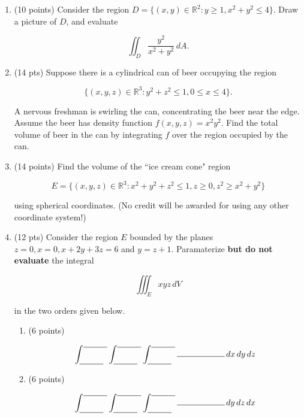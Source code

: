\documentclass[12 pt]{report}
\begin{document}
\newpage

\begin{enumerate}

\item (10 points) Consider the region $D = \{(x,y) \in \mathbb{R}^2: y \geq 1, x^2+y^2 \leq 4\}.$ Draw a picture of $D$, and evaluate

\[
\iint_D \frac{y^2}{x^2+y^2} \, dA.
\]

\newpage

\item (14 pts) Suppose there is a cylindrical can of beer occupying the region 

\[
\{(x,y,z) \in \mathbb{R}^3: y^2 + z^2 \leq 1, 0 \leq x \leq 4\}.
\]

A nervous freshman is swirling the can, concentrating the beer near the edge. Assume the beer has density function $f(x,y,z) = x^2 y^2$. Find the total volume of beer in the can by integrating $f$ over the region occupied by the can. 

\newpage

\item (14 points) Find the volume of the ``ice cream cone" region 

\[
E = \{(x,y,z) \in \mathbb{R}^3: x^2+y^2+z^2 \leq 1, z \geq 0, z^2 \geq x^2+y^2\}
\] 

using spherical coordinates. (No credit will be awarded for using any other coordinate system!)

\newpage


\item (12 pts) Consider the region $E$ bounded by the planes $z = 0, x = 0, x+2y+3z = 6$ and $y = z+1$. Paramaterize \textbf{but do not evaluate} the integral 

\[
\iiint_E xyz \, dV
\]

in the two orders given below. 

\begin{enumerate} \item (6 points) 

\begin{equation*}
 \int_{\rule{1cm}{.15mm}}^{\rule{1cm}{.15mm}}  \int_{\rule{1cm}{.15mm}}^{\rule{1cm}{.15mm}}  \int_{\rule{1cm}{.15mm}}^{\rule{1cm}{.15mm}} \rule{2cm}{.15mm} \, dx \, dy \, dz
\end{equation*}

\vfill

\item (6 points) 

\begin{equation*}
 \int_{\rule{1cm}{.15mm}}^{\rule{1cm}{.15mm}}  \int_{\rule{1cm}{.15mm}}^{\rule{1cm}{.15mm}}  \int_{\rule{1cm}{.15mm}}^{\rule{1cm}{.15mm}} \rule{2cm}{.15mm} \, dy \, dz \, dx
\end{equation*}
\vfill
\end{enumerate}



\end{enumerate}
\end{document}

